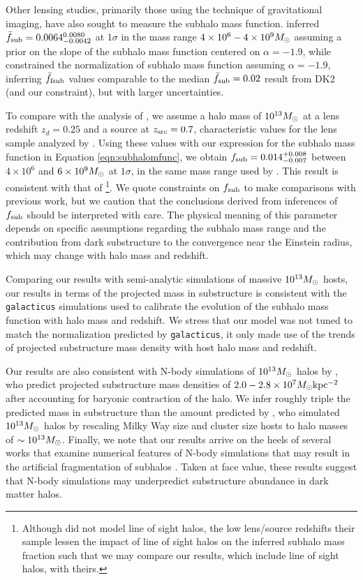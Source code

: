 Other lensing studies, primarily those using the technique of gravitational imaging, have also sought to measure the subhalo mass function. \citet{Veg++14} inferred ${\bar{f}_{\rm{sub}}}= 0.0064_{-0.0042}^{0.0080}$ at $1 \sigma$ in the mass range $4 \times 10^6 - 4 \times 10^9 {M_{\odot}}$ assuming a prior on the slope of the subhalo mass function centered on $\alpha = -1.9$, while \citet{Hezaveh++16} constrained the normalization of subhalo mass function assuming $\alpha = -1.9$, inferring $\bar{f}_{\rm{fsub}}$ values comparable to the median $\bar{f}_{\rm{sub}} = 0.02$ result from DK2 (and our constraint), but with larger uncertainties. 

To compare with the analysis of \citet{Veg++14}, we assume a halo mass of $10^{13}{M_{\odot}}$ at a lens redshift $z_d = 0.25$ and a source at $z_{\rm{src}} = 0.7$, characteristic values for the lens sample analyzed by \citet{Veg++14}. Using these values with our expression for the subhalo mass function in Equation \ref{eqn:subhalomfunc}, we obtain ${{f}_{\rm{sub}}}= 0.014_{-0.007}^{+0.008}$ between $4 \times 10^6$ and $6 \times 10^9 {M_{\odot}}$ at $1 \sigma$, in the same mass range used by \citet{Veg++14}. This result is consistent with that of \citet{Veg++14}\footnote{Although \citet{Veg++14} did not model line of sight halos, the low lens/source redshifts their sample lessen the impact of line of sight halos on the inferred subhalo mass fraction such that we may compare our results, which include line of sight halos, with theirs.}. We quote constraints on $f_{\rm{sub}}$ to make comparisons with previous work, but we caution that the conclusions derived from inferences of $f_{\rm{sub}}$ should be interpreted with care. The physical meaning of this parameter depends on specific assumptions regarding the subhalo mass range and the contribution from dark substructure to the convergence near the Einstein radius, which may change with halo mass and redshift. 

Comparing our results with semi-analytic simulations of massive $10^{13} {M_{\odot}}$ hosts, our results in terms of the projected mass in substructure is consistent with the {\tt{galacticus}} simulations used to calibrate the evolution of the subhalo mass function with halo mass and redshift. We stress that our model was not tuned to match the normalization predicted by {\tt{galacticus}}, it only made use of the trends of projected substructure mass density with host halo mass and redshift. 

Our results are also consistent with N-body simulations of $10^{13} {M_{\odot}}$ halos by \citet{Fiacconi++16}, who predict projected substructure mass densities of $2.0-2.8 \times 10^{7} {M_{\odot}} \rm{kpc^{-2}}$ after accounting for baryonic contraction of the halo. We infer roughly triple the predicted mass in substructure than the amount predicted by \citet{Xu++15}, who simulated $10^{13}{M_{\odot}}$ halos by rescaling Milky Way size and cluster size hosts to halo masses of $\sim 10^{13} {M_{\odot}}$. Finally, we note that our results arrive on the heels of several works that examine numerical features of N-body simulations that may result in the artificial fragmentation of subhalos \citep{vandenBosch++18,ErraniPenarrubia19}. Taken at face value, these results suggest that N-body simulations may underpredict substructure abundance in dark matter halos. 

